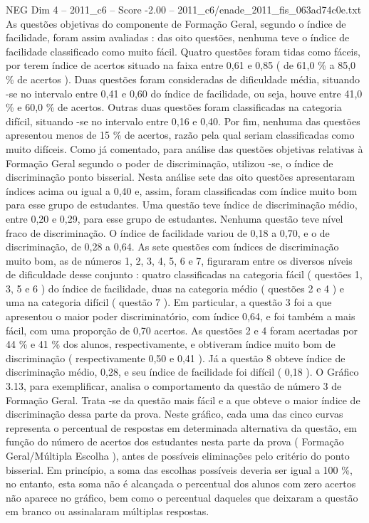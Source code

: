 \begin{textsample}{NEG Dim 4 – 2011\_c6 – Score -2.00 – 2011\_c6/enade\_2011\_fis\_063ad74c0e.txt}
As questões objetivas do componente de Formação Geral, segundo o índice de facilidade, foram assim avaliadas : das oito questões, nenhuma teve o índice de facilidade classificado como muito fácil.
Quatro questões foram tidas como fáceis, por terem índice de acertos situado na faixa entre 0,61 e 0,85 ( de 61,0 \% a 85,0 \% de acertos ).
Duas questões foram consideradas de dificuldade média, situando -se no intervalo entre 0,41 e 0,60 do índice de facilidade, ou seja, houve entre 41,0 \% e 60,0 \% de acertos.
Outras duas questões foram classificadas na categoria difícil, situando -se no intervalo entre 0,16 e 0,40.
Por fim, nenhuma das questões apresentou menos de 15 \% de acertos, razão pela qual seriam classificadas como muito difíceis.
Como já comentado, para análise das questões objetivas relativas à Formação Geral segundo o poder de discriminação, utilizou -se, o índice de discriminação ponto bisserial.
Nesta análise sete das oito questões apresentaram índices acima ou igual a 0,40 e, assim, foram classificadas com índice muito bom para esse grupo de estudantes.
Uma questão teve índice de discriminação médio, entre 0,20 e 0,29, para esse grupo de estudantes.
Nenhuma questão teve nível fraco de discriminação.
O índice de facilidade variou de 0,18 a 0,70, e o de discriminação, de 0,28 a 0,64.
As sete questões com índices de discriminação muito bom, as de números 1, 2, 3, 4, 5, 6 e 7, figuraram entre os diversos níveis de dificuldade desse conjunto : quatro classificadas na categoria fácil ( questões 1, 3, 5 e 6 ) do índice de facilidade, duas na categoria médio ( questões 2 e 4 ) e uma na categoria difícil ( questão 7 ).
Em particular, a questão 3 foi a que apresentou o maior poder discriminatório, com índice 0,64, e foi também a mais fácil, com uma proporção de 0,70 acertos.
As questões 2 e 4 foram acertadas por 44 \% e 41 \% dos alunos, respectivamente, e obtiveram índice muito bom de discriminação ( respectivamente 0,50 e 0,41 ).
Já a questão 8 obteve índice de discriminação médio, 0,28, e seu índice de facilidade foi difícil ( 0,18 ).
O Gráfico 3.13, para exemplificar, analisa o comportamento da questão de número 3 de Formação Geral.
Trata -se da questão mais fácil e a que obteve o maior índice de discriminação dessa parte da prova.
Neste gráfico, cada uma das cinco curvas representa o percentual de respostas em determinada alternativa da questão, em função do número de acertos dos estudantes nesta parte da prova ( Formação Geral/Múltipla Escolha ), antes de possíveis eliminações pelo critério do ponto bisserial.
Em princípio, a soma das escolhas possíveis deveria ser igual a 100 \%, no entanto, esta soma não é alcançada o percentual dos alunos com zero acertos não aparece no gráfico, bem como o percentual daqueles que deixaram a questão em branco ou assinalaram múltiplas respostas.

\end{textsample}
